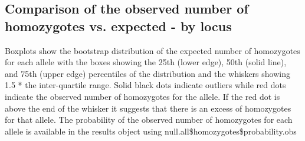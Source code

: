 \documentclass[a4paper]{scrartcl}\usepackage[]{graphicx}\usepackage[]{color}
\begin{document}
\subsection{Comparison of the observed number of homozygotes vs. expected - by locus}
Boxplots show the bootstrap distribution of the expected number of homozygotes for each allele with the boxes showing the 25th (lower edge), 50th (solid line), and 75th (upper edge) percentiles of the distribution and the whiskers showing 1.5 * the inter-quartile range. Solid black dots indicate outliers while red dots indicate the observed number of homozygotes for the allele. If the red dot is above the end of the whisker it suggests that there is an excess of homozygotes for that allele. 
\newline
\newline The probability of the observed number of homozygotes for each allele is available in the results object using null.all\$homozygotes\$probability.obs
\end{document}
